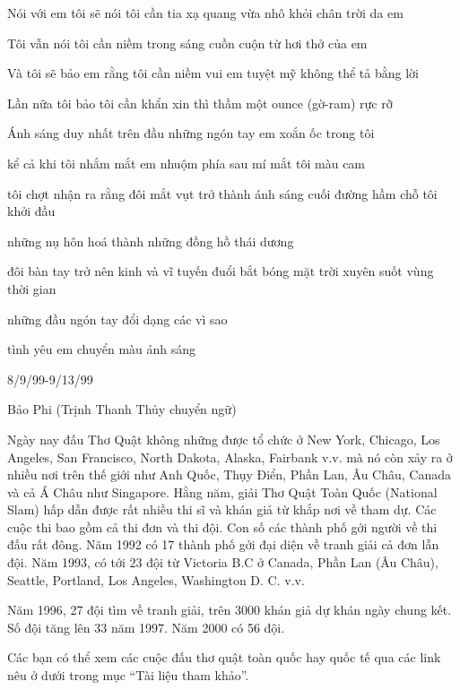\documentclass[../main.tex]{subfiles}
\begin{document}
\begin{multicols}{2}
\begin{blockquote}
Nói với em tôi sẽ nói        
tôi cần tia xạ quang vừa nhô khỏi chân trời da em 
        
Tôi vẫn nói tôi cần niềm trong sáng         
cuồn cuộn từ hơi thở        
của em 
        
Và tôi sẽ bảo em rằng tôi cần niềm vui        
em tuyệt mỹ không thể tả bằng lời 
        
Lần nữa tôi bảo tôi cần        
khẩn xin thì thầm một ounce (gờ-ram) rực rỡ 
        
Ánh sáng duy nhất trên đầu những ngón tay em        
xoắn ốc trong tôi 
        
kể cả khi tôi nhắm mắt        
em nhuộm        
phía sau mí mắt tôi màu cam 
        
tôi chợt nhận ra rằng        
đôi mắt vụt trở thành ánh sáng cuối đường hầm        
chỗ tôi khởi đầu 
        
những nụ hôn hoá thành những đồng hồ thái dương 
        
đôi bàn tay trở nên kinh và vĩ tuyến        
đuổi bắt bóng mặt trời xuyên suốt vùng thời gian 
        
những đầu ngón tay đổi dạng các vì sao 
        
tình yêu em chuyển màu ánh sáng 
        
8/9/99-9/13/99 
        
Bảo Phi        
(Trịnh Thanh Thủy chuyển ngữ) 

\end{blockquote}
 
Ngày nay đấu Thơ Quật không những được tổ chức ở New York, Chicago, Los Angeles, San Francisco, North Dakota, Alaska, Fairbank v.v. mà nó còn xảy ra ở nhiều nơi trên thế giới như Anh Quốc, Thụy Điển, Phần Lan, Âu Châu, Canada và cả Á Châu như Singapore. Hằng năm, giải Thơ Quật Toàn Quốc (National Slam) hấp dẫn được rất nhiều thi sĩ và khán giả từ khắp nơi về tham dự. Các cuộc thi bao gồm cả thi đơn và thi đội. Con số các thành phố gởi người về thi đấu rất đông. Năm 1992 có 17 thành phố gởi đại diện về tranh giải cả đơn lẫn đội. Năm 1993, có tới 23 đội từ Victoria B.C ở Canada, Phần Lan (Âu Châu), Seattle, Portland, Los Angeles, Washington D. C. v.v. 
 
Năm 1996, 27 đội tìm về tranh giải, trên 3000 khán giả dự khán ngày chung kết. Số đội tăng lên 33 năm 1997. Năm 2000 có 56 đội.  
 
Các bạn có thể xem các cuộc đấu thơ quật toàn quốc hay quốc tế qua các link nêu ở dưới trong mục “Tài liệu tham khảo”. 
 

\end{multicols}
\end{document}
